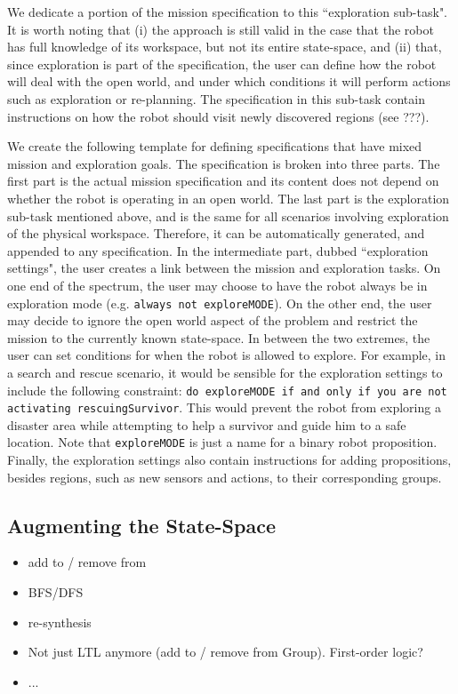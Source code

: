 We dedicate a portion of the mission specification to this ``exploration sub-task". It is worth noting that (i) the approach is still valid in the case that the robot has full knowledge of its workspace, but not its entire state-space, and (ii) that, since exploration is part of the specification, the user can define how the robot will deal with the open world, and under which conditions it will perform actions such as exploration or re-planning. The specification in this sub-task contain instructions on how the robot should visit newly discovered regions (see ???).

We create the following template for defining specifications that have mixed mission and exploration goals. The specification is broken into three parts. The first part is the actual mission specification and its content does not depend on whether the robot is operating in an open world. The last part is the exploration sub-task mentioned above, and is the same for all scenarios involving exploration of the physical workspace. Therefore, it can be automatically generated, and appended to any specification. In the intermediate part, dubbed ``exploration settings", the user creates a link between the mission and exploration tasks. On one end of the spectrum, the user may choose to have the robot always be in exploration mode (e.g. \texttt{always not exploreMODE}). On the other end, the user may decide to ignore the open world aspect of the problem and restrict the mission to the currently known state-space. In between the two extremes, the user can set conditions for when the robot is allowed to explore. For example, in a search and rescue scenario, it would be sensible for the exploration settings to include the following constraint: \texttt{do exploreMODE if and only if you are not activating rescuingSurvivor}. This would prevent the robot from exploring a disaster area while attempting to help a survivor and guide him to a safe location. Note that \texttt{exploreMODE} is just a name for a binary robot proposition. Finally, the exploration settings also contain instructions for adding propositions, besides regions, such as new sensors and actions, to their corresponding groups.

\subsection{Augmenting the State-Space} %

\begin{itemize}
	\item add to / remove from
	\item BFS/DFS
	\item re-synthesis
	\item Not just LTL anymore (add to / remove from Group). First-order logic?
	\item ...
\end{itemize}

